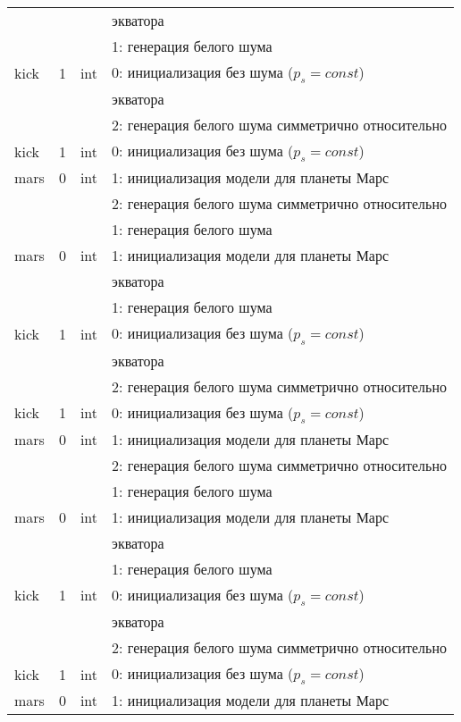 \begin{longtable*}[c]{|l|c|l|l|}
  & & & экватора    \\
 &   &     & 1: генерация белого шума                  \\
 kick & 1 & int & 0: инициализация без шума (\(p_s = const\)) \\
      & & & экватора    \\
      &   &     & 2: генерация белого шума симметрично относительно \\
  kick & 1 & int & 0: инициализация без шума (\(p_s = const\)) \\
 mars & 0 & int & 1: инициализация модели для планеты Марс     \\
&   &     & 2: генерация белого шума симметрично относительно \\
      &   &     & 1: генерация белого шума                  \\
      mars & 0 & int & 1: инициализация модели для планеты Марс     \\
  & & & экватора    \\
 &   &     & 1: генерация белого шума                  \\
kick & 1 & int & 0: инициализация без шума (\(p_s = const\)) \\
      & & & экватора    \\
      &   &     & 2: генерация белого шума симметрично относительно \\
  kick & 1 & int & 0: инициализация без шума (\(p_s = const\)) \\
 mars & 0 & int & 1: инициализация модели для планеты Марс     \\
&   &     & 2: генерация белого шума симметрично относительно \\
      &   &     & 1: генерация белого шума                  \\
      mars & 0 & int & 1: инициализация модели для планеты Марс     \\
  & & & экватора    \\
 &   &     & 1: генерация белого шума                  \\
kick & 1 & int & 0: инициализация без шума (\(p_s = const\)) \\
      & & & экватора    \\
      &   &     & 2: генерация белого шума симметрично относительно \\
  kick & 1 & int & 0: инициализация без шума (\(p_s = const\)) \\
 mars & 0 & int & 1: инициализация модели для планеты Марс     \\

\end{longtable*}
